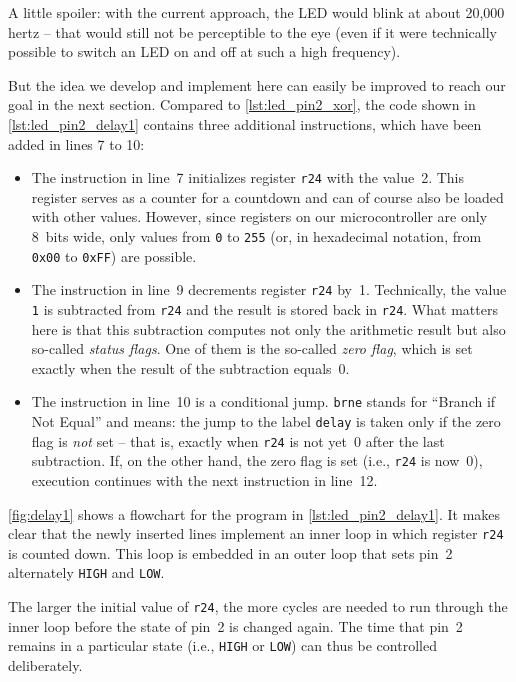 \documentclass[a4paper,12pt]{article}
\begin{document}
A little spoiler: with the current approach, the LED would blink at about
20,000 hertz – that would still not be perceptible to the eye (even if it
were technically possible to switch an LED on and off at such a high
frequency).

But the idea we develop and implement here can easily be improved to reach
our goal in the next section.
Compared to \autoref{lst:led_pin2_xor}, the code shown in
\autoref{lst:led_pin2_delay1} contains three additional instructions, which
have been added in lines 7 to 10:

\begin{itemize}
    \item
	The instruction in line~7 initializes register \texttt{r24} with the
	value~2. This register serves as a counter for a countdown and can of
	course also be loaded with other values. However, since registers on
	our microcontroller are only 8~bits wide, only values from \texttt{0}
	to \texttt{255} (or, in hexadecimal notation, from \texttt{0x00} to
	\texttt{0xFF}) are possible.

    \item
	The instruction in line~9 decrements register \texttt{r24} by~1.
	Technically, the value \texttt{1} is subtracted from \texttt{r24} and
	the result is stored back in \texttt{r24}. What matters here is that
	this subtraction computes not only the arithmetic result but also
	so-called \emph{status flags}. One of them is the so-called
	\emph{zero flag}, which is set exactly when the result of the
	subtraction equals~0.

    \item
	The instruction in line~10 is a conditional jump. \texttt{brne}
	stands for \enquote{Branch if Not Equal} and means: the jump to the
	label \texttt{delay} is taken only if the zero flag is \emph{not}
	set – that is, exactly when \texttt{r24} is not yet~0 after the last
	subtraction. If, on the other hand, the zero flag is set (i.e.,
	\texttt{r24} is now~0), execution continues with the next instruction
	in line~12.
\end{itemize}

\noindent
\autoref{fig:delay1} shows a flowchart for the program in
\autoref{lst:led_pin2_delay1}. It makes clear that the newly inserted lines
implement an inner loop in which register \texttt{r24} is counted down. This
loop is embedded in an outer loop that sets pin~2 alternately \texttt{HIGH}
and \texttt{LOW}.

The larger the initial value of \texttt{r24}, the more cycles are needed to
run through the inner loop before the state of pin~2 is changed again. The
time that pin~2 remains in a particular state (i.e., \texttt{HIGH} or
\texttt{LOW}) can thus be controlled deliberately.
\end{document}

